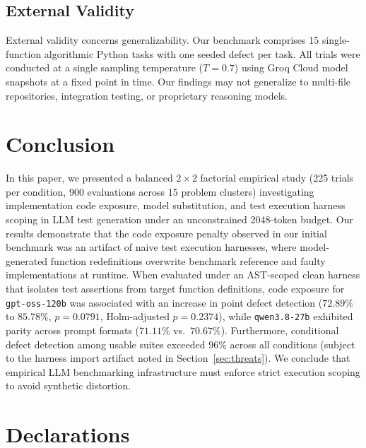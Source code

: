 \documentclass[11pt,a4paper]{article}
\begin{document}
\subsection{External Validity}
External validity concerns generalizability. Our benchmark comprises 15 single-function algorithmic Python tasks with one seeded defect per task. All trials were conducted at a single sampling temperature ($T=0.7$) using Groq Cloud model snapshots at a fixed point in time. Our findings may not generalize to multi-file repositories, integration testing, or proprietary reasoning models.


\section{Conclusion}
\label{sec:conclusion}

In this paper, we presented a balanced $2 \times 2$ factorial empirical study (225 trials per condition, 900 evaluations across 15 problem clusters) investigating implementation code exposure, model substitution, and test execution harness scoping in LLM test generation under an unconstrained 2048-token budget.
Our results demonstrate that the code exposure penalty observed in our initial benchmark was an artifact of naive test execution harnesses, where model-generated function redefinitions overwrite benchmark reference and faulty implementations at runtime. When evaluated under an AST-scoped clean harness that isolates test assertions from target function definitions, code exposure for \texttt{gpt-oss-120b} was associated with an increase in point defect detection ($72.89\%$ to $85.78\%$, $p = 0.0791$, Holm-adjusted $p = 0.2374$), while \texttt{qwen3.8-27b} exhibited parity across prompt formats ($71.11\%$ vs.\ $70.67\%$). Furthermore, conditional defect detection among usable suites exceeded $96\%$ across all conditions (subject to the harness import artifact noted in Section~\ref{sec:threats}). We conclude that empirical LLM benchmarking infrastructure must enforce strict execution scoping to avoid synthetic distortion.


\section*{Declarations}
\end{document}
